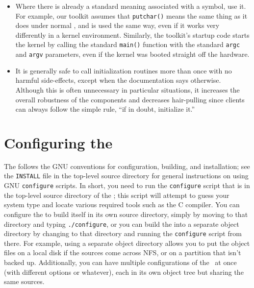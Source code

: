 \begin{itemize}
\item	Where there is already a standard meaning associated with a symbol,
	use it.
	For example, our toolkit assumes that
	{\tt putchar()} means the same thing as it does under normal \posix{},
	and is used the same way,
	even if it works very differently in a kernel environment.
	Similarly, the toolkit's startup code
	starts the kernel by calling the standard {\tt main()} function
	with the standard {\tt argc} and {\tt argv} parameters,
	even if the kernel was booted straight off the hardware.

\item	It is generally safe to call initialization routines more than once
	with no harmful side-effects,
	except when the documentation says otherwise.
	Although this is often unnecessary in particular situations,
	it increases the overall robustness of the components
	and decreases hair-pulling
	since clients can always follow the simple rule,
	``if in doubt, initialize it.''
\end{itemize}

\section{Configuring the \oskit{}}

The \oskit{} follows the GNU conventions for configuration,
building, and installation;
see the {\tt INSTALL} file in the top-level source directory
for general instructions on using GNU \texttt{configure} scripts.
In short, you need to run the {\tt configure} script
that is in the top-level source directory of the \oskit;
this script will attempt to guess your system type
and locate various required tools such as the C compiler.
You can configure the \oskit{} to build itself in its own source directory,
simply by moving to that directory and typing \texttt{./configure},
or you can build the \oskit{} into a separate object directory
by changing to that directory
and running the \texttt{configure} script from there.
For example, using a separate object directory
allows you to put the object files on a local disk
if the sources come across NFS,
or on a partition that isn't backed up.
Additionally, you can have multiple configurations of the \oskit\ at once
(with different options or whatever),
each in its own object tree but sharing the same sources.

